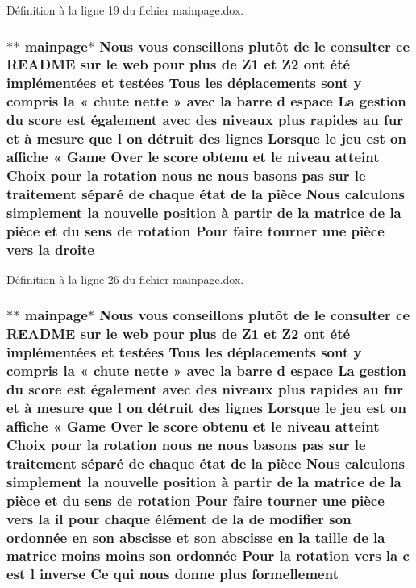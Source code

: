 Définition à la ligne 19 du fichier mainpage.\-dox.

\hypertarget{mainpage_8dox_a44857f9a24461fe0301d67a95db5ef7e}{
\subsubsection[{droite}]{\setlength{\rightskip}{0pt plus 5cm}$\ast$$\ast$ mainpage$\ast$ Nous vous conseillons plutô{\bf t} {\bf de} le consulter ce R\-E\-A\-D\-M\-E sur le web pour plus {\bf de} {\bf Z1} et Z2 ont é{\bf t}é implémentées et testées Tous les déplacements sont {\bf y} compris la « chute nette » avec la barre d espace La gestion du score est également avec des niveaux plus rapides au fur et à mesure que l on détruit des lignes Lorsque le jeu est on affiche « Game Over le score obtenu et le niveau atteint Choix pour la rotation nous ne nous basons pas sur le traitement {\bf s}éparé {\bf de} chaque état {\bf de} la pièce Nous calculons simplement la nouvelle position à partir {\bf de} la {\bf matrice} {\bf de} la pièce et du {\bf sens} {\bf de} rotation Pour faire tourner une pièce vers la droite}}\label{mainpage_8dox_a44857f9a24461fe0301d67a95db5ef7e}


Définition à la ligne 26 du fichier mainpage.\-dox.

\hypertarget{mainpage_8dox_a8ffca62ef80121335ee87bc64b966cfa}{
\subsubsection[{formellement}]{\setlength{\rightskip}{0pt plus 5cm}$\ast$$\ast$ mainpage$\ast$ Nous vous conseillons plutô{\bf t} {\bf de} le consulter ce R\-E\-A\-D\-M\-E sur le web pour plus {\bf de} {\bf Z1} et Z2 ont é{\bf t}é implémentées et testées Tous les déplacements sont {\bf y} compris la « chute nette » avec la barre d espace La gestion du score est également avec des niveaux plus rapides au fur et à mesure que l on détruit des lignes Lorsque le jeu est on affiche « Game Over le score obtenu et le niveau atteint Choix pour la rotation nous ne nous basons pas sur le traitement {\bf s}éparé {\bf de} chaque état {\bf de} la pièce Nous calculons simplement la nouvelle position à partir {\bf de} la {\bf matrice} {\bf de} la pièce et du {\bf sens} {\bf de} rotation Pour faire tourner une pièce vers la il pour chaque élément {\bf de} la {\bf de} modifier son ordonnée en son abscisse et son abscisse en la taille {\bf de} la {\bf matrice} moins moins son ordonnée Pour la rotation vers la {\bf c} est l inverse Ce qui nous donne plus formellement}}\label{mainpage_8dox_a8ffca62ef80121335ee87bc64b966cfa}


